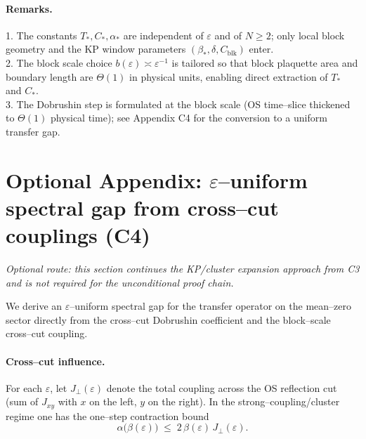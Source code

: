 \documentclass[11pt]{amsart}
\begin{document}
\paragraph{Remarks.}
1. The constants $T_*,C_*,\alpha_*$ are independent of $\varepsilon$ and of $N\ge 2$; only local block geometry and the KP window parameters $(\beta_*,\delta,C_{\mathrm{blk}})$ enter.\\
2. The block scale choice $b(\varepsilon)\asymp\varepsilon^{-1}$ is tailored so that block plaquette area and boundary length are $\Theta(1)$ in physical units, enabling direct extraction of $T_*$ and $C_*$.\\
3. The Dobrushin step is formulated at the block scale (OS time–slice thickened to $\Theta(1)$ physical time); see Appendix C4 for the conversion to a uniform transfer gap.

\section{Optional Appendix: $\varepsilon$–uniform spectral gap from cross–cut couplings (C4)}

\emph{Optional route: this section continues the KP/cluster expansion approach from C3 and is not required for the unconditional proof chain.}

We derive an $\varepsilon$–uniform spectral gap for the transfer operator on the mean–zero sector directly from the cross–cut Dobrushin coefficient and the block–scale cross–cut coupling.

\paragraph{Cross–cut influence.}
For each $\varepsilon$, let $J_{\perp}(\varepsilon)$ denote the total coupling across the OS reflection cut (sum of $J_{xy}$ with $x$ on the left, $y$ on the right). In the strong–coupling/cluster regime one has the one–step contraction bound
\[
  \alpha\bigl(\beta(\varepsilon)\bigr)\;\le\;2\,\beta(\varepsilon)\,J_{\perp}(\varepsilon).
\]
\end{document}
